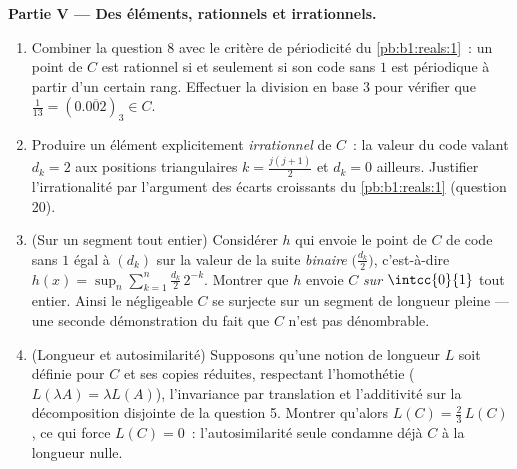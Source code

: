 \begin{problem}[{Devoir maison --- l'\omterm{def:b1:logic:sets}{ensemble} triadique de Cantor~:
longueur nulle, non dénombrable, parfait, et $C + C =
\intcc{0}{2}$}]
\medskip
\noindent\textbf{Partie V --- Des éléments, rationnels et irrationnels.}
\begin{enumerate}[resume]
  \item Combiner la question 8 avec le critère de périodicité du
        \cref{pb:b1:reals:1}~: un point de $C$ est rationnel si et
        seulement si son code sans $1$ est périodique à partir
        d'un certain rang. Effectuer la division en base $3$ pour
        vérifier que $\frac1{13} = (0.\overline{002})_3 \in C$.
  \item Produire un élément explicitement \emph{irrationnel} de
        $C$~: la valeur du code valant $d_k = 2$ aux positions
        triangulaires $k = \frac{j(j+1)}{2}$ et $d_k = 0$
        ailleurs. Justifier l'irrationalité par l'argument des
        écarts croissants du \cref{pb:b1:reals:1} (question 20).
  \item (Sur un segment tout entier) Considérer $h$ qui envoie le
        point de $C$ de code sans $1$ égal à $(d_k)$ sur la
        valeur de la suite \emph{binaire} $\bigl(\frac{d_k}2\bigr)$,
        c'est-à-dire $h(x) = \sup_n \sum_{k=1}^n \frac{d_k}{2}\,2^{-k}$.
        Montrer que $h$ envoie $C$ \emph{sur} $\intcc{0}{1}$ tout
        entier. Ainsi le négligeable $C$ se surjecte sur un
        segment de longueur pleine --- une seconde démonstration
        du fait que $C$ n'est pas dénombrable.
  \item (Longueur et autosimilarité) Supposons qu'une notion de
        longueur $L$ soit définie pour $C$ et ses copies
        réduites, respectant l'homothétie ($L(\lambda A) = \lambda L(A)$),
        l'invariance par translation et l'additivité sur la
        décomposition disjointe de la question 5. Montrer
        qu'alors $L(C) = \frac23\,L(C)$, ce qui force $L(C) = 0$~:
        l'autosimilarité seule condamne déjà $C$ à la longueur
        nulle.
\end{enumerate}


\end{problem}
